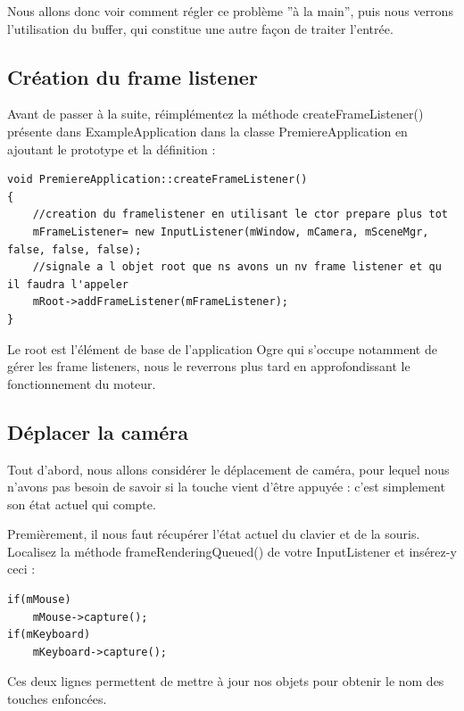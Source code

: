 \documentclass[10pt,a4paper]{report}
\begin{document}
Nous allons donc voir comment r\'egler ce probl\`eme ''\`a la main'', puis nous verrons l'utilisation du buffer, qui constitue une autre fa\c{c}on de traiter l'entr\'ee.

\subsection{Cr\'eation du frame listener}

Avant de passer \`a la suite, r\'eimpl\'ementez la m\'ethode createFrameListener() pr\'esente dans ExampleApplication dans la classe PremiereApplication en ajoutant le prototype et la d\'efinition :

\begin{lstlisting}[caption={InputListener.cpp}]
void PremiereApplication::createFrameListener()
{
    //creation du framelistener en utilisant le ctor prepare plus tot
    mFrameListener= new InputListener(mWindow, mCamera, mSceneMgr, false, false, false);
    //signale a l objet root que ns avons un nv frame listener et qu il faudra l'appeler
    mRoot->addFrameListener(mFrameListener);
}
\end{lstlisting}

Le root est l'\'el\'ement de base de l'application Ogre qui s'occupe notamment de g\'erer les frame listeners, nous le reverrons plus tard en approfondissant le fonctionnement du moteur.
 









\subsection{D\'eplacer la cam\'era}


Tout d'abord, nous allons consid\'erer le d\'eplacement de cam\'era, pour lequel nous n'avons pas besoin de savoir si la touche vient d'\^etre appuy\'ee : c'est simplement son \'etat actuel qui compte.

Premi\`erement, il nous faut r\'ecup\'erer l'\'etat actuel du clavier et de la souris. Localisez la m\'ethode frameRenderingQueued() de votre InputListener et ins\'erez-y ceci :


\begin{lstlisting}[caption={}]
if(mMouse)
    mMouse->capture();
if(mKeyboard)
    mKeyboard->capture();
\end{lstlisting}

Ces deux lignes permettent de mettre \`a jour nos objets pour obtenir le nom des touches enfonc\'ees.\newline
\end{document}

